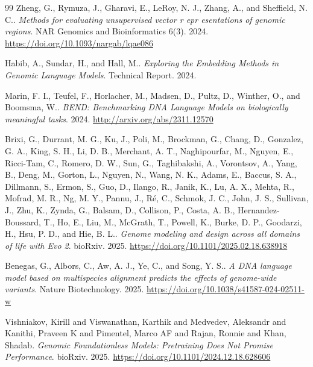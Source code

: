 \documentclass{ifacconf}
\begin{document}
\begin{thebibliography}{99}
Zheng, G., Rymuza, J., Gharavi, E., LeRoy, N. J., Zhang, A., and Sheffield, N. C..
\textit{Methods for evaluating unsupervised vector r epr esentations of genomic regions}.
NAR Genomics and Bioinformatics 6(3). 2024.
\url{https://doi.org/10.1093/nargab/lqae086}

Habib, A., Sundar, H., and Hall, M..
\textit{Exploring the Embedding Methods in Genomic Language Models}.
Technical Report. 2024.

Marin, F. I., Teufel, F., Horlacher, M., Madsen, D., Pultz, D., Winther, O., and Boomsma, W..
\textit{BEND: Benchmarking DNA Language Models on biologically meaningful tasks}.
2024.
\url{http://arxiv.org/abs/2311.12570}

Brixi, G., Durrant, M. G., Ku, J., Poli, M., Brockman, G., Chang, D., Gonzalez, G. A., King, S. H., Li, D. B., Merchant, A. T., Naghipourfar, M., Nguyen, E., Ricci-Tam, C., Romero, D. W., Sun, G., Taghibakshi, A., Vorontsov, A., Yang, B., Deng, M., Gorton, L., Nguyen, N., Wang, N. K., Adams, E., Baccus, S. A., Dillmann, S., Ermon, S., Guo, D., Ilango, R., Janik, K., Lu, A. X., Mehta, R., Mofrad, M. R., Ng, M. Y., Pannu, J., Ré, C., Schmok, J. C., John, J. S., Sullivan, J., Zhu, K., Zynda, G., Balsam, D., Collison, P., Costa, A. B., Hernandez-Boussard, T., Ho, E., Liu, M., McGrath, T., Powell, K., Burke, D. P., Goodarzi, H., Hsu, P. D., and Hie, B. L..
\textit{Genome modeling and design across all domains of life with Evo 2}.
bioRxiv. 2025.
\url{https://doi.org/10.1101/2025.02.18.638918}

Benegas, G., Albors, C., Aw, A. J., Ye, C., and Song, Y. S..
\textit{A DNA language model based on multispecies alignment predicts the effects of genome-wide variants}.
Nature Biotechnology. 2025.
\url{https://doi.org/10.1038/s41587-024-02511-w}

Vishniakov, Kirill and Viswanathan, Karthik and Medvedev, Aleksandr and Kanithi, Praveen K and Pimentel, Marco AF and Rajan, Ronnie and Khan, Shadab.
\textit{Genomic Foundationless Models: Pretraining Does Not Promise Performance}.
bioRxiv. 2025.
\url{https://doi.org/10.1101/2024.12.18.628606}


\end{thebibliography}
\end{document}
